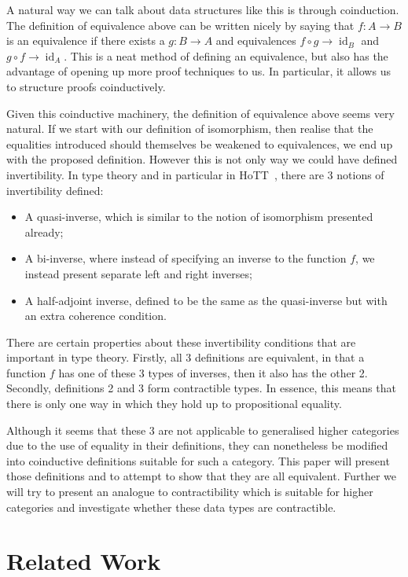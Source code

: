 \documentclass{article}
\theoremstyle{definition}
\theoremstyle{remark}
\DeclareMathOperator{\id}{id}
\begin{document}
A natural way we can talk about data structures like this is through coinduction. The definition of equivalence above can be written nicely by saying that \(f : A \to B\) is an equivalence if there exists a \(g : B \to A\) and equivalences \(f \circ g \to \id_B\) and \(g \circ f \to \id_A\). This is a neat method of defining an equivalence, but also has the advantage of opening up more proof techniques to us. In particular, it allows us to structure proofs coinductively.

Given this coinductive machinery, the definition of equivalence above seems very natural. If we start with our definition of isomorphism, then realise that the equalities introduced should themselves be weakened to equivalences, we end up with the proposed definition. However this is not only way we could have defined invertibility. In type theory and in particular in HoTT~\cite{hottbook}, there are 3 notions of invertibility defined:

\begin{itemize}
\item A quasi-inverse, which is similar to the notion of isomorphism presented already;
\item A bi-inverse, where instead of specifying an inverse to the function \(f\), we instead present separate left and right inverses;
\item A half-adjoint inverse, defined to be the same as the quasi-inverse but with an extra coherence condition.
\end{itemize}

There are certain properties about these invertibility conditions that are important in type theory. Firstly, all 3 definitions are equivalent, in that a function \(f\) has one of these 3 types of inverses, then it also has the other 2. Secondly, definitions 2 and 3 form contractible types. In essence, this means that there is only one way in which they hold up to propositional equality.

Although it seems that these 3 are not applicable to generalised higher categories due to the use of equality in their definitions, they can nonetheless be modified into coinductive definitions suitable for such a category. This paper will present those definitions and to attempt to show that they are all equivalent. Further we will try to present an analogue to contractibility which is suitable for higher categories and investigate whether these data types are contractible.

\section{Related Work}\label{sec:related}
\end{document}
